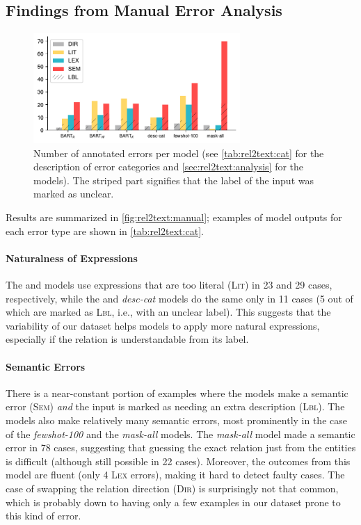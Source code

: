 \subsection{Findings from Manual Error Analysis}


\begin{figure}[t]
    \centering
    \includegraphics[width=0.7\textwidth]{img/rel2text-graph.pdf}
    \caption{Number of annotated errors per model (see \autoref{tab:rel2text:cat} for the description of error categories and \autoref{sec:rel2text:analysis} for the models). The striped part signifies that the label of the input was marked as unclear.}
    \label{fig:rel2text:manual}
\end{figure}
Results are summarized in \autoref{fig:rel2text:manual}; examples of model outputs for each error type are shown in \autoref{tab:rel2text:cat}.

\paragraph{Naturalness of Expressions} The \BARTk{} and \BARTw{} models use expressions that are too literal (\textsc{Lit}) in 23 and 29 cases, respectively, while the \BARTr{} and \textit{desc-cat} models do the same only in 11 cases (5 out of which are marked as \textsc{Lbl}, i.e., with an unclear label). This suggests that the variability of our dataset helps models to apply more natural expressions, especially if the relation is understandable from its label.

\paragraph{Semantic Errors} There is a near-constant portion of examples where the models make a semantic error (\textsc{Sem}) \textit{and} the input is marked as needing an extra description (\textsc{Lbl}). The models also make relatively many semantic errors, most prominently in the case of the \textit{fewshot-100} and the \textit{mask-all} models. The \textit{mask-all} model made a semantic error in 78 cases, suggesting that guessing the exact relation just from the entities is difficult (although still possible in 22 cases). Moreover, the outcomes from this model are fluent (only 4 \textsc{Lex} errors), making it hard to detect faulty cases.
The case of swapping the relation direction (\textsc{Dir}) is surprisingly not that common, which is probably down to having only a few examples in our dataset prone to this kind of error.

